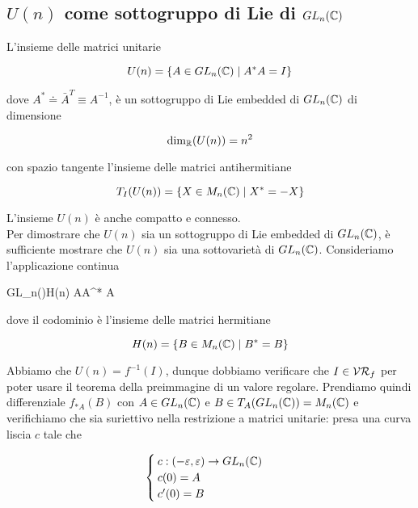\subsection{$ U(n) $ come sottogruppo di Lie di $ GL_{n}(\mathbb{C}) $}

L'insieme delle matrici unitarie

\begin{equation}
	U(n) = \{ A \in GL_{n}(\mathbb{C}) \mid A^{*} A = I \}
\end{equation}

dove $ A^{*} \doteq \bar{A}^{T} \equiv A^{-1} $, è un sottogruppo di Lie embedded di $ GL_{n}(\mathbb{C}) $ di dimensione

\begin{equation}
	\dim_{\mathbb{R}}(U(n)) = n^{2}
\end{equation}

con spazio tangente l'insieme delle matrici antihermitiane

\begin{equation}
	T_{I}(U(n)) = \{ X \in M_{n}(\mathbb{C}) \mid X^{*} = -X \}
\end{equation}

L'insieme $ U(n) $ è anche compatto e connesso.\\
Per dimostrare che $ U(n) $ sia un sottogruppo di Lie embedded di $ GL_{n}(\mathbb{C}) $, è sufficiente mostrare che $ U(n) $ sia una sottovarietà di $ GL_{n}(\mathbb{C}) $. Consideriamo l'applicazione continua

	{GL_{n}(\C)}{H(n)}
	{A}{A^{*} A}

dove il codominio è l'insieme delle matrici hermitiane

\begin{equation}
	H(n) = \{ B \in M_{n}(\mathbb{C}) \mid B^{*} = B \}
\end{equation}

Abbiamo che $ U(n) = f^{-1}(I) $, dunque dobbiamo verificare che $ I \in \mathcal{VR}_{f} $ per poter usare il teorema della preimmagine di un valore regolare. Prendiamo quindi differenziale $ f_{*A}(B) $ con $ A \in GL_{n}(\mathbb{C}) $ e $ B \in T_{A}(GL_{n}(\mathbb{C})) = M_{n}(\mathbb{C}) $ e verifichiamo che sia suriettivo nella restrizione a matrici unitarie: presa una curva liscia $ c $ tale che

\begin{equation}
	\begin{cases}
		c : (-\varepsilon,\varepsilon) \to GL_{n}(\mathbb{C}) \\
		c(0) = A \\
		c'(0) = B
	\end{cases}
\end{equation}

